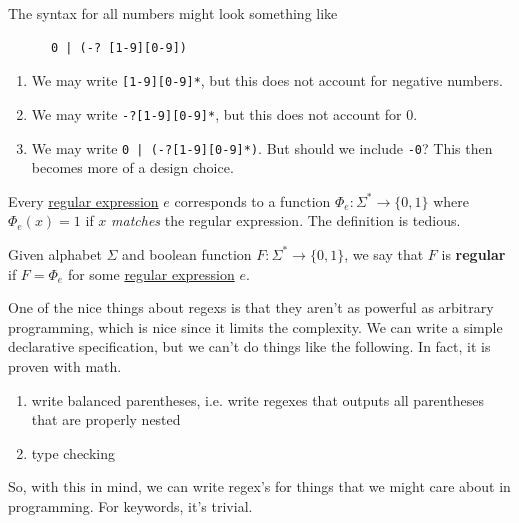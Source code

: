   \begin{example}
    \label{ex:generated-language-of-all-c-identifiers}
    The syntax for all numbers might look something like 
    \begin{lstlisting}
      0 | (-? [1-9][0-9])
    \end{lstlisting}
  \end{example}

  \begin{example}
    \label{ex:numeric-identifiers}
 
    \begin{enumerate}
      \item We may write \texttt{[1-9][0-9]*}, but this does not account for negative numbers. 
      \item We may write \texttt{-?[1-9][0-9]*}, but this does not account for $0$. 
      \item We may write \texttt{0 | (-?[1-9][0-9]*)}. But should we include \texttt{-0}? This then becomes more of a design choice. 
    \end{enumerate}
  \end{example}

  Every \hyperref[def:regular_expression]{regular expression} $e$ corresponds to a function $\Phi_e : \Sigma^* \to \{0,1\}$ where $\Phi_e (x) = 1$ if $x$ \textit{matches} the regular expression. The definition is tedious. 

	\begin{definition}
	  \label{def:regular-boolean-function}
		Given alphabet $\Sigma$ and boolean function $F: \Sigma^* \to \{0,1\}$, we say that $F$ is \textbf{regular} if $F = \Phi_e$ for some \hyperref[def:regular_expression]{regular expression} $e$. 
  \end{definition}

  One of the nice things about regexs is that they aren't as powerful as arbitrary programming, which is nice since it limits the complexity. We can write a simple declarative specification, but we can't do things like the following. In fact, it is proven with math. 
  \begin{enumerate}
    \item write balanced parentheses, i.e. write regexes that outputs all parentheses that are properly nested
    \item type checking
  \end{enumerate}
  So, with this in mind, we can write regex's for things that we might care about in programming. For keywords, it's trivial. 

